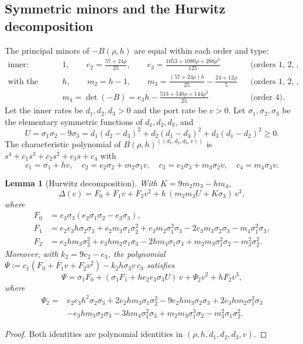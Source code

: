 \documentclass[11pt,a4paper]{article}
\theoremstyle{plain}
\newtheorem{lemma}[theorem]{Lemma}
\theoremstyle{definition}
\theoremstyle{remark}
\newcommand{\scl}[2]{#1^{(#2)}}
\begin{document}
\subsection{Symmetric minors and the Hurwitz decomposition}
The principal minors of $-B(\rho,h)$ are equal within each order and type:
\begin{align*}
\text{inner:}\quad &1,\qquad e_2=\tfrac{57+24\rho}{25},\qquad e_3=\tfrac{1053+1080\rho+288\rho^2}{125}
&&\text{(orders 1, 2, 3)},\\
\text{with the port:}\quad &h,\qquad m_2=h-1,\qquad m_3=\tfrac{(57+24\rho)h}{25}-\tfrac{24+12\rho}{5}
&&\text{(orders 1, 2, 3)},\\
&m_4=\det(-B)=e_3h-\tfrac{513+540\rho+144\rho^2}{25}&&\text{(order 4)}.
\end{align*}
Let the inner rates be $d_1,d_2,d_3>0$ and the port rate be $v>0$. Let
$\sigma_1,\sigma_2,\sigma_3$ be the elementary symmetric functions of $d_1,d_2,d_3$, and
\[
U=\sigma_1\sigma_2-9\sigma_3=d_1(d_2-d_3)^2+d_2(d_1-d_3)^2+d_3(d_1-d_2)^2\ge0 .
\]
The characteristic polynomial of $\scl{B(\rho,h)}{(d_1,d_2,d_3,v)}$ is
$s^4+c_1s^3+c_2s^2+c_3s+c_4$ with
\begin{equation}\label{eq:coeffs}
c_1=\sigma_1+hv,\quad c_2=e_2\sigma_2+m_2\sigma_1v,\quad c_3=e_3\sigma_3+m_3\sigma_2v,\quad c_4=m_4\sigma_3v .
\end{equation}

\begin{lemma}[Hurwitz decomposition]\label{lem:decomp}
With $K=9m_2m_3-hm_4$,
\[
\Delta(c)=F_0+F_1v+F_2v^2+h\,(m_2m_3U+K\sigma_3)\,v^3,
\]
where
\begin{align*}
F_0&=e_3\sigma_3(e_2\sigma_1\sigma_2-e_3\sigma_3),\\
F_1&=e_2e_3h\sigma_2\sigma_3+e_2m_3\sigma_1\sigma_2^2+e_3m_2\sigma_1^2\sigma_3-2e_3m_3\sigma_2\sigma_3-m_4\sigma_1^2\sigma_3,\\
F_2&=e_2hm_3\sigma_2^2+e_3hm_2\sigma_1\sigma_3-2hm_4\sigma_1\sigma_3+m_2m_3\sigma_1^2\sigma_2-m_3^2\sigma_2^2 .
\end{align*}
Moreover, with $k_2=9e_2-e_3$, the polynomial
$\Psi:=c_1(F_0+F_1v+F_2v^2)-k_2h\sigma_3v\,c_3$ satisfies
\begin{equation}\label{eq:psi}
\Psi=\sigma_1F_0+(\sigma_1F_1+he_2e_3\sigma_3U)\,v+\Psi_2v^2+hF_2v^3,
\end{equation}
where
\begin{align*}
\Psi_2={}&e_2e_3h^2\sigma_2\sigma_3+2e_2hm_3\sigma_1\sigma_2^2-9e_2hm_3\sigma_2\sigma_3+2e_3hm_2\sigma_1^2\sigma_3\\
&-e_3hm_3\sigma_2\sigma_3-3hm_4\sigma_1^2\sigma_3+m_2m_3\sigma_1^3\sigma_2-m_3^2\sigma_1\sigma_2^2 .
\end{align*}
\end{lemma}
\begin{proof}
Both identities are polynomial identities in $(\rho,h,d_1,d_2,d_3,v)$.
\end{proof}
\end{document}
